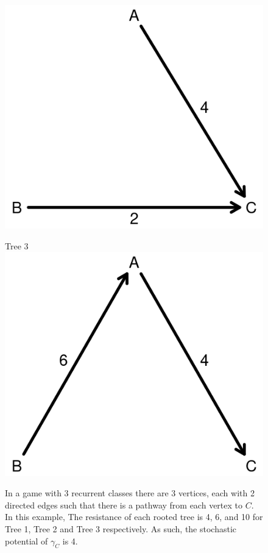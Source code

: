 \begin{figure}[h]
\begin{minipage}[c]{.32\textwidth}
\includegraphics[width = \textwidth]{Images/Tree2.png}
\end{minipage}
\begin{minipage}[c]{.32\textwidth}
\centering
Tree 3
\vskip6pt
\includegraphics[width = \textwidth]{Images/Tree3.png}
\end{minipage}
\vskip12pt
\small
\centering
In a game with 3 recurrent classes there are 3 vertices, each with 2 directed edges such that there is a pathway from each vertex to $C$. In this example, The resistance of each rooted tree is 4, 6, and 10 for Tree 1, Tree 2 and Tree 3 respectively. As such, the stochastic potential of $\gamma_C$ is 4.  
\end{figure}
\justifying
\vskip12pt


